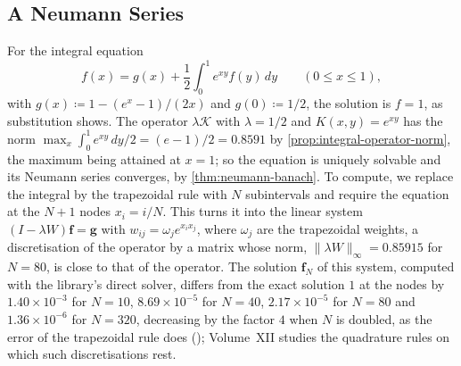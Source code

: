 \subsection{A Neumann Series}

For the integral equation
\[
f(x)=g(x)+\frac12\int_0^1e^{xy}f(y)\,dy\qquad(0\le x\le1),
\]
with $g(x)\coloneqq1-(e^x-1)/(2x)$ and $g(0)\coloneqq1/2$, the solution is $f=1$, as substitution shows. The operator $\lambda\mathcal K$ with $\lambda=1/2$ and $K(x,y)=e^{xy}$ has the norm $\max_x\int_0^1e^{xy}\,dy/2=(e-1)/2=0.8591$ by \cref{prop:integral-operator-norm}, the maximum being attained at $x=1$; so the equation is uniquely solvable and its Neumann series converges, by \cref{thm:neumann-banach}. To compute, we replace the integral by the trapezoidal rule with $N$ subintervals and require the equation at the $N+1$ nodes $x_i=i/N$. This turns it into the linear system $(I-\lambda W)\mathbf f=\mathbf g$ with $w_{ij}=\omega_je^{x_ix_j}$, where $\omega_j$ are the trapezoidal weights, a discretisation of the operator by a matrix whose norm, $\|\lambda W\|_\infty=0.85915$ for $N=80$, is close to that of the operator. The solution $\mathbf f_N$ of this system, computed with the library's direct solver, differs from the exact solution $1$ at the nodes by $1.40\times10^{-3}$ for $N=10$, $8.69\times10^{-5}$ for $N=40$, $2.17\times10^{-5}$ for $N=80$ and $1.36\times10^{-6}$ for $N=320$, decreasing by the factor $4$ when $N$ is doubled, as the error of the trapezoidal rule does (); Volume~XII studies the quadrature rules on which such discretisations rest.


